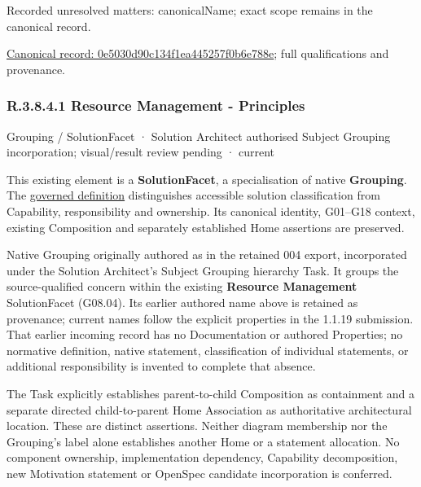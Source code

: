 {\small Recorded unresolved matters: canonicalName; exact scope remains in the canonical record.}\par
{\footnotesize \href{../../../../../../../continuum/grouping/0e5030d90c134f1ea445257f0b6e788e.md}{Canonical record: 0e5030d90c134f1ea445257f0b6e788e}; full qualifications and provenance.}\par
\subsubsection*{R.3.8.4.1 Resource Management - Principles}
\label{navigation:R.3.8.4.1}

\label{element:8d58b9333a374b9cbe936f34919fc122}
{\small Grouping / SolutionFacet · Solution Architect authorised Subject Grouping incorporation; visual/result review pending · current}\par

This existing element is a \textbf{SolutionFacet}, a specialisation of native
\textbf{Grouping}. The \href{\detokenize{../../../../../../../governance/continuum-representation.md#solutionfacet-classification--1119-candidate}}{governed definition}
distinguishes accessible solution classification from Capability, responsibility
and ownership. Its canonical identity, G01–G18 context, existing Composition
and separately established Home assertions are preserved.



Native Grouping originally authored as \texttt{} in the retained 004 export,
incorporated under the Solution Architect's Subject Grouping hierarchy Task.
It groups the source-qualified \texttt{} concern within
the existing \textbf{Resource Management} SolutionFacet (G08.04). Its earlier authored name above is retained as provenance; current names
follow the explicit properties in the 1.1.19 submission.
That earlier incoming record has no Documentation or authored Properties; no normative
definition, native statement, classification of individual statements, or
additional responsibility is invented to complete that absence.



The Task explicitly establishes parent-to-child Composition as containment and
a separate directed child-to-parent Home Association as authoritative architectural
location. These are distinct assertions. Neither diagram membership nor the
Grouping's label alone establishes another Home or a statement allocation.
No component ownership, implementation dependency, Capability decomposition,
new Motivation statement or OpenSpec candidate incorporation is conferred.



